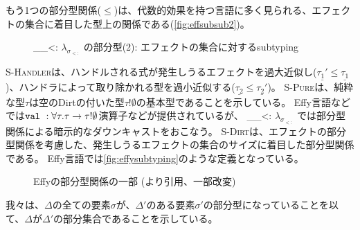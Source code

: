 \documentclass{ltjsarticle}
\def\effsub{
  \ifmmode
    \lambda_{\sigma_{<:}}
  \else
    $\lambda_{\sigma_{<:}}$
  \fi
}
\begin{document}
もう1つの部分型関係($\leqslant$)は、代数的効果を持つ言語に多く見られる、エフェクトの集合に着目した型上の関係である(\autoref{fig:effsubsub2})。
\begin{figure}[ht]
  \centering
  \begin{framed}
    \begin{multicols}{3}


      \infax[S-Pure]{
        \overline{\tau!\emptyset \leqslant \tau}
      }
    \end{multicols} 
    \vspace{0.4\baselineskip}

  \end{framed}
  \caption{\effsub{}の部分型(2): エフェクトの集合に対するsubtyping}
  \label{fig:effsubsub2}
\end{figure}
\textsc{S-Handler}は、ハンドルされる式が発生しうるエフェクトを過大近似し($\underline{\tau_1'}\leqslant\underline{\tau_1}$)、ハンドラによって取り除かれる型を過小近似する($\underline{\tau_2}\leqslant\underline{\tau_2'}$)。
\textsc{S-Pure}は、純粋な型$\tau$は空のDirtの付いた型$\tau!\emptyset$の基本型であることを示している。
Effy言語などでは$\valK : \forall \tau. \tau \rightarrow \tau!\emptyset$演算子などが提供されているが、\effsub{}では部分型関係による暗示的なダウンキャストをおこなう。
\textsc{S-Dirt}は、エフェクトの部分型関係を考慮した、発生しうるエフェクトの集合のサイズに着目した部分型関係である。
Effy言語では\autoref{fig:effysubtyping}のような定義となっている。
\begin{figure}[ht]
  \centering
  \framed
  \endframed
  \caption{Effyの部分型関係の一部 (\cite{pretnar2017efficient}より引用、一部改変)}
  \label{fig:effysubtyping}
\end{figure}
我々は、$\Delta$の全ての要素$\sigma$が、$\Delta'$のある要素$\sigma'$の部分型になっていることを以て、$\Delta$が$\Delta'$の部分集合であることを示している。
\end{document}
